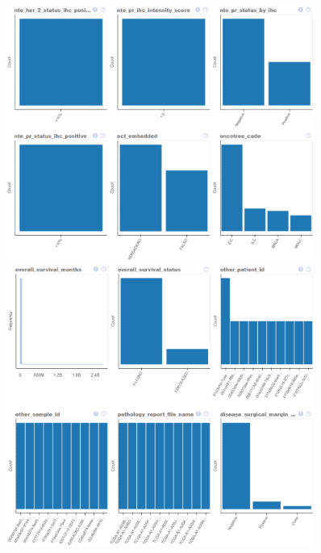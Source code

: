 \begin{figure}
	\includegraphics[width=0.9\textwidth]{NOTEBOOK/IMAGES_EDA/13}
	\includegraphics[width=0.9\textwidth]{NOTEBOOK/IMAGES_EDA/14}
\end{figure}

